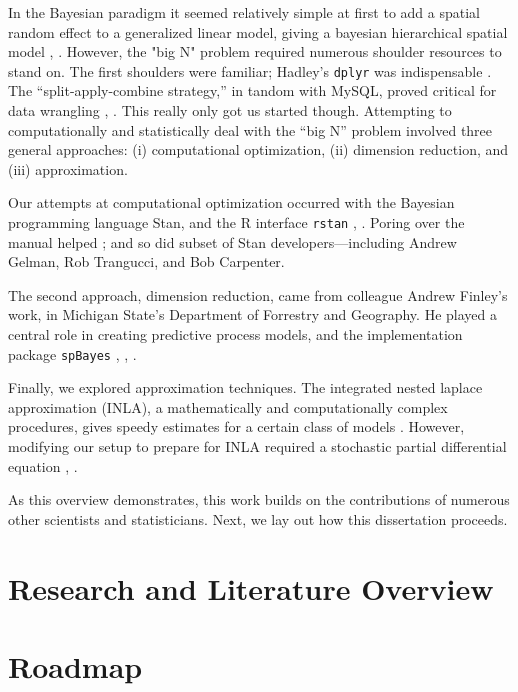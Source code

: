 In the Bayesian paradigm it seemed relatively simple at first to add a spatial random effect to a generalized linear model, giving a bayesian hierarchical spatial model \citep{Gelman2014}, \citep{Banerjee2014}. However, the "big N" problem required numerous shoulder resources to stand on. The first shoulders were familiar; Hadley's \verb|dplyr| was indispensable \citep{Wickham2016}. The ``split-apply-combine strategy,'' in tandom with MySQL, proved critical for data wrangling \citep{Wickham2016}, \citep{Tahaghoghi2006}. This really only got us started though. Attempting to computationally and statistically deal with the ``big N'' problem involved three general approaches: (i) computational optimization, (ii) dimension reduction, and (iii) approximation.

Our attempts at computational optimization occurred with the Bayesian programming language Stan, and the R interface \verb|rstan| \citep{rstan}, \citep{Gelman2015}. Poring over the manual  helped \citep{STANtheMan}; and so did subset of Stan developers---including Andrew Gelman, Rob Trangucci, and Bob Carpenter.

The second approach, dimension reduction, came from colleague Andrew Finley's work, in Michigan State's Department of Forrestry and Geography. He played a central role in creating predictive process models, and the implementation package \verb|spBayes| \citep{Banerjee2008}, \citep{Finley2012}, \citep{Finley2013}.

Finally, we explored approximation techniques. The integrated nested laplace approximation (INLA), a mathematically and computationally complex procedures, gives speedy estimates for a certain class of models \citep{Rue2009}. However, modifying our setup to prepare for INLA required a stochastic partial differential equation \citep{Lindgren2011}, \citep{Lindstrom2016}. 

As this overview demonstrates, this work builds on the contributions of numerous other scientists and statisticians. Next, we lay out how this dissertation proceeds.


\section{Research and Literature Overview}

\section{Roadmap}

